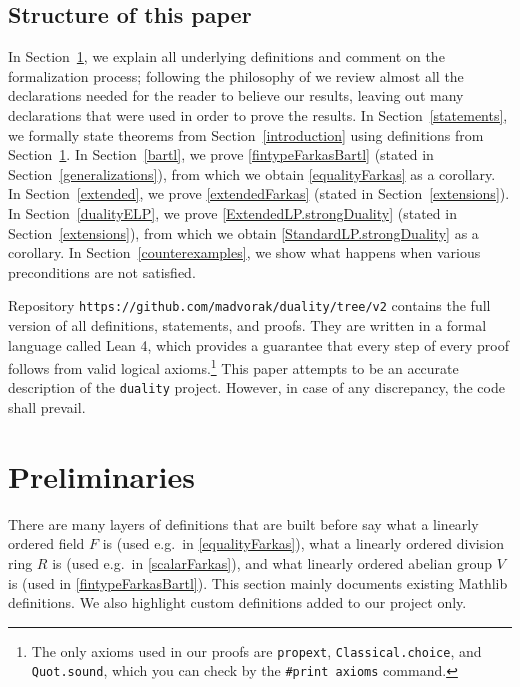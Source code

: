 \documentclass[]{article}
\renewcommand{\.}{\hskip .75pt}
\newcommand{\sekt}[1]{Section~\ref{#1}}
\begin{document}
\subsection{Structure of this paper}

In \sekt{preliminaries}, we explain all underlying definitions and
comment on the formalization process;
following the philosophy of \cite{Believe}
we review almost all the declarations needed for the reader to believe
our results, leaving out many declarations that were used in order
to prove the results.
In \sekt{statements}, we formally state theorems from \sekt{introduction}
using definitions from \sekt{preliminaries}.
In \sekt{bartl}, we prove \ref{fintypeFarkasBartl} (stated in \sekt{generalizations}),
from which we obtain \ref{equalityFarkas} as a corollary.
In \sekt{extended}, we prove \ref{extendedFarkas} (stated in \sekt{extensions}).
In \sekt{dualityELP}, we prove \ref{ExtendedLP.strongDuality}
(stated in \sekt{extensions}), from which we obtain
\ref{StandardLP.strongDuality} as a corollary.
In \sekt{counterexamples}, we show what happens when various preconditions
are not satisfied.

Repository \texttt{https://github.com/madvorak/duality/tree/v2}
contains the full version of all definitions, statements,
and proofs. They are written in a formal language called
Lean 4, which provides a guarantee that every step of
every proof follows from valid logical axioms.\footnote{
The only axioms used in our proofs are
\texttt{propext}, \texttt{Classical.choice}, and
\texttt{Quot.sound}, which you can check by the
\texttt{\#print axioms} command.}
This paper attempts to be an accurate description of
the \texttt{duality} project.
However, in case of any discrepancy, the code shall prevail.

\section{Preliminaries}
\label{preliminaries}

There are many layers of definitions that are built before say
what a linearly ordered field $F$ is (used e.g.~in \ref{equalityFarkas}),
what a linearly ordered division ring $R$ is (used e.g.~in \ref{scalarFarkas}), and
what linearly ordered abelian group $V$ is (used in \ref{fintypeFarkasBartl}).
This section mainly documents existing Mathlib definitions.
We also highlight custom definitions added to our project only.
\end{document}
